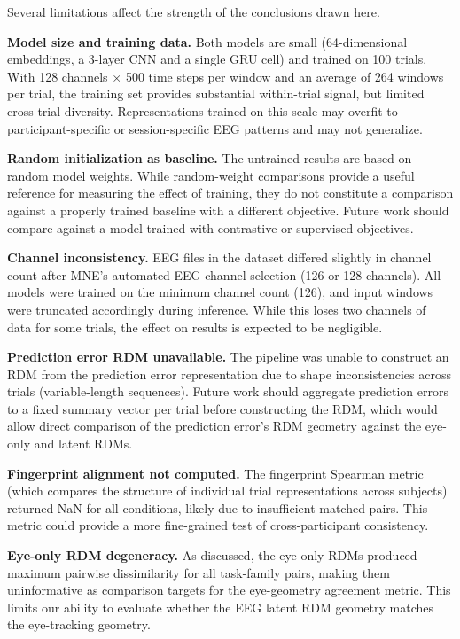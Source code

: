 \documentclass[11pt, letterpaper]{article}
\begin{document}
Several limitations affect the strength of the conclusions drawn here.

\textbf{Model size and training data.} Both models are small (64-dimensional embeddings,
a 3-layer CNN and a single GRU cell) and trained on 100 trials. With 128 channels
$\times$ 500 time steps per window and an average of 264 windows per trial, the training
set provides substantial within-trial signal, but limited cross-trial diversity.
Representations trained on this scale may overfit to participant-specific or
session-specific EEG patterns and may not generalize.

\textbf{Random initialization as baseline.} The untrained results are based on random
model weights. While random-weight comparisons provide a useful reference for measuring
the effect of training, they do not constitute a comparison against a properly trained
baseline with a different objective. Future work should compare against a model trained
with contrastive or supervised objectives.

\textbf{Channel inconsistency.} EEG files in the dataset differed slightly in channel
count after MNE's automated EEG channel selection (126 or 128 channels). All models
were trained on the minimum channel count (126), and input windows were truncated
accordingly during inference. While this loses two channels of data for some trials,
the effect on results is expected to be negligible.

\textbf{Prediction error RDM unavailable.} The pipeline was unable to construct an RDM
from the prediction error representation due to shape inconsistencies across trials
(variable-length sequences). Future work should aggregate prediction errors to a fixed
summary vector per trial before constructing the RDM, which would allow direct
comparison of the prediction error's RDM geometry against the eye-only and latent RDMs.

\textbf{Fingerprint alignment not computed.} The fingerprint Spearman metric (which
compares the structure of individual trial representations across subjects) returned NaN
for all conditions, likely due to insufficient matched pairs. This metric could provide
a more fine-grained test of cross-participant consistency.

\textbf{Eye-only RDM degeneracy.} As discussed, the eye-only RDMs produced maximum
pairwise dissimilarity for all task-family pairs, making them uninformative as comparison
targets for the eye-geometry agreement metric. This limits our ability to evaluate
whether the EEG latent RDM geometry matches the eye-tracking geometry.
\end{document}
